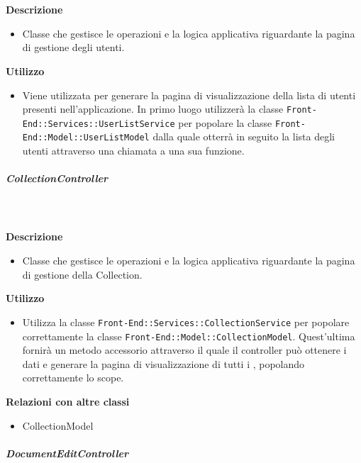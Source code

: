         \textbf{\\ \\ Descrizione} 
          \begin{itemize}
            \item[] Classe che gestisce le operazioni e la logica applicativa riguardante la pagina di gestione degli utenti.
          \end{itemize}      
        \textbf{Utilizzo}  
          \begin{itemize}
            \item[] Viene utilizzata per generare la pagina di visualizzazione della lista di utenti presenti nell'applicazione. In primo luogo utilizzerà la classe \texttt{Front-End::Services::UserListService} per popolare la classe \texttt{Front-End::Model::UserListModel} dalla quale otterrà in seguito la lista degli utenti attraverso una chiamata a una sua funzione.
          \end{itemize}
      \subparagraph{CollectionController}
        
        \textbf{\\ \\ Descrizione} 
          \begin{itemize}
            \item[] Classe che gestisce le operazioni e la logica applicativa riguardante la pagina di gestione della Collection.
          \end{itemize}      
        \textbf{Utilizzo}  
          \begin{itemize}
            \item[] Utilizza la classe \texttt{Front-End::Services::CollectionService} per popolare correttamente la classe \texttt{Front-End::Model::CollectionModel}. Quest'ultima fornirà un metodo accessorio attraverso il quale il controller può ottenere i dati e generare la pagina di visualizzazione di tutti i , popolando correttamente lo scope.
          \end{itemize}
          \textbf{Relazioni con altre classi}
          \begin{itemize}
              \item{CollectionModel}
          \end{itemize}
      \subparagraph{DocumentEditController}
        
